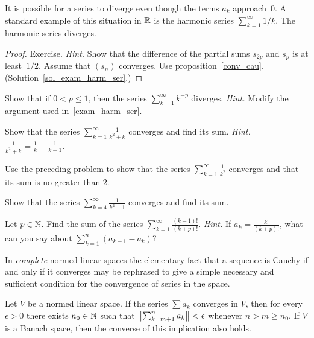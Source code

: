 \begin{exam}\label{exam_harm_ser}  It is possible for a series to diverge even though the
terms $a_k$ approach~$0$.  A standard example of this situation in $\mathbb{R}$ is the harmonic series
$\sum_{k=1}^\infty 1/k$.  The harmonic series diverges.
\end{exam}

\begin{proof}  Exercise. \emph{Hint.}  Show that the difference of the partial sums $s_{2p}$
and $s_p$ is at least~$1/2$.  Assume that $(s_n)$ converges. Use proposition~\ref{conv_cau}.
 (Solution~\ref{sol_exam_harm_ser}.)  \ns
\end{proof}

\begin{prob} Show that if $0 < p \le 1$, then the series $\sum_{k=1}^\infty k^{-p}$ diverges.
\emph{Hint.}  Modify the argument used in~\ref{exam_harm_ser}.
\end{prob}

\begin{prob}  Show that the series $\sum_{k=1}^\infty \frac1{k^2+k}$ converges and find its sum.
\emph{Hint.} $\frac1{k^2 + k} = \frac1k - \frac1{k + 1}$.
\end{prob}

\begin{prob} Use the preceding problem to show that the series $\sum_{k=1}^\infty \frac1{k^2}$
converges and that its sum is no greater than $2$.
\end{prob}

\begin{prob} Show that the series $\sum_{k=4}^\infty\frac1{k^2-1}$ converges and find its sum.
\end{prob}

\begin{prob} Let $p \in \mathbb{N}$.  Find the sum of the series $\sum_{k=1}^\infty\frac{(k-1)!}{(k+p)!}$.
\emph{Hint.}  If $a_k = \frac{k!}{(k+p)!}$, what can you say about $\sum_{k=1}^n(a_{k-1} -
a_k)$?
\end{prob}

In \emph{complete} normed linear spaces the elementary fact that a sequence is Cauchy if and
only if it converges may be rephrased to give a simple necessary and sufficient condition for
the convergence of series in the space.

\begin{prop}\label{prop_Cauchy_crit}
Let $V$ be a normed linear space.  If the series $\sum a_k$ converges in $V$, then for every
$\epsilon > 0$ there exists $n_0 \in \mathbb{N}$ such that $\left\lVert\sum_{k=m+1}^n a_k\right\rVert < \epsilon$
whenever $n > m \ge n_0$.  If $V$ is a Banach space, then the converse of this implication
also holds.
\end{prop}

